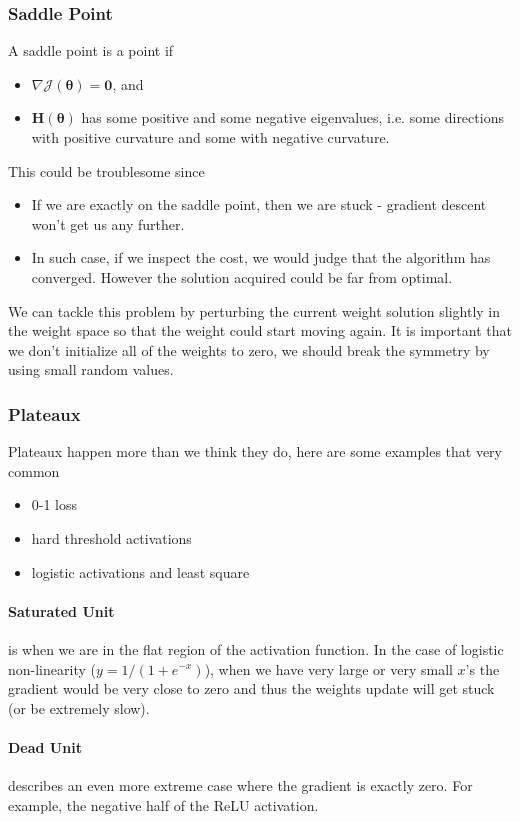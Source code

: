 \documentclass[11pt]{article}
\begin{document}
\subsubsection{Saddle Point}
A saddle point is a point if
\begin{itemize}
    \item $\nabla \mathcal{J}(\boldsymbol{\theta})=\mathbf{0}$, and
    \item $\mathbf{H}(\boldsymbol{\theta} )$ has some positive and some negative eigenvalues, i.e. some directions with positive curvature and some with negative curvature. 
\end{itemize}
This could be troublesome since
\begin{itemize}
    \item If we are exactly on the saddle point, then we are stuck - gradient descent won't get us any further.
    \item In such case, if we inspect the cost, we would judge that the algorithm has converged. However the solution acquired could be far from optimal. 
\end{itemize}
We can tackle this problem by perturbing the current weight solution slightly in the weight space so that the weight could start moving again. It is important that we don't initialize all of the weights to zero, we should break the symmetry by using small random values. 

\subsubsection{Plateaux}
Plateaux happen more than we think they do, here are some examples that very common
\begin{itemize}
    \item 0-1 loss
    \item hard threshold activations
    \item logistic activations and least square
\end{itemize}
\paragraph{Saturated Unit} is when we are in the flat region of the activation function. In the case of logistic non-linearity ($y = 1/(1 + e^{-x})$), when we have very large or very small $x$'s the gradient would be very close to zero and thus the weights update will get stuck (or be extremely slow).   
\paragraph{Dead Unit} describes an even more extreme case where the gradient is exactly zero. For example, the negative half of the ReLU activation. 
\end{document}
